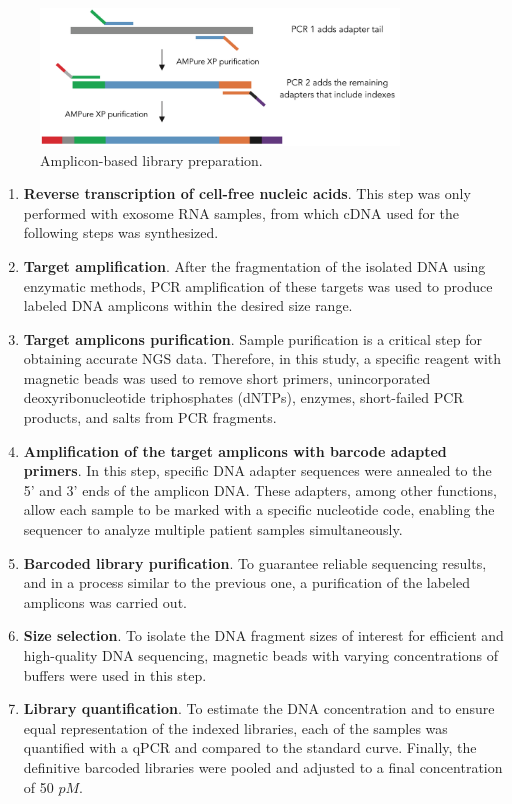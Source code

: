 \begin{figure}[ht]
    \centering
    \includegraphics[width=0.85\textwidth]{Images/chapter_3/NGS_library.png}
    \caption{Amplicon-based library preparation.}
    \label{fig:library}
\end{figure}

\begin{enumerate}[font=\bfseries]
    \item \textbf{Reverse transcription of cell-free nucleic acids}. This step was only performed with exosome RNA samples, from which cDNA used for the following steps was synthesized.
    \item \textbf{Target amplification}. After the fragmentation of the isolated DNA using enzymatic methods, PCR amplification of these targets was used to produce labeled DNA amplicons within the desired size range.
    \item \textbf{Target amplicons purification}. Sample purification is a critical step for obtaining accurate NGS data. Therefore, in this study, a specific reagent with magnetic beads was used to remove short primers, unincorporated deoxyribonucleotide triphosphates (dNTPs), enzymes, short-failed PCR products, and salts from PCR fragments.
    \item \textbf{Amplification of the target amplicons with barcode adapted primers}. In this step, specific DNA adapter sequences were annealed to the 5' and 3' ends of the amplicon DNA. These adapters, among other functions, allow each sample to be marked with a specific nucleotide code, enabling the sequencer to analyze multiple patient samples simultaneously.
    \item \textbf{Barcoded library purification}. To guarantee reliable sequencing results, and in a process similar to the previous one, a purification of the labeled amplicons was carried out.
    \item \textbf{Size selection}. To isolate the DNA fragment sizes of interest for efficient and high-quality DNA sequencing, magnetic beads with varying concentrations of buffers were used in this step.
    \item \textbf{Library quantification}. To estimate the DNA concentration and to ensure equal representation of the indexed libraries, each of the samples was quantified with a qPCR and compared to the standard curve. Finally, the definitive barcoded libraries were pooled and adjusted to a final concentration of 50 $pM$.
\end{enumerate}

